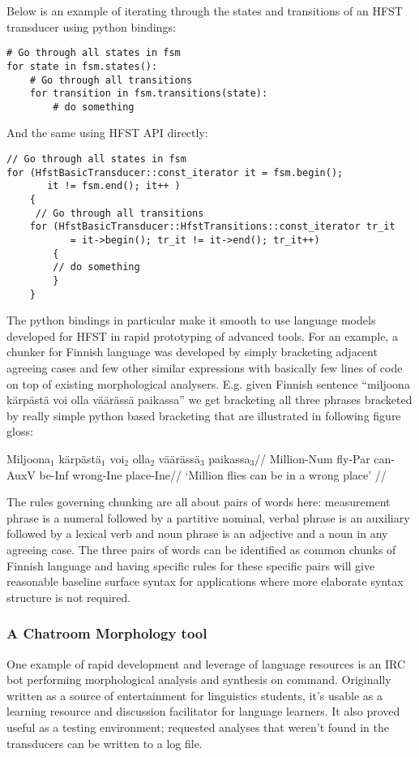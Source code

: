 \documentclass{llncs}
\begin{document}
Below is an example of iterating through the states and transitions of
an HFST transducer using python bindings:

\begin{verbatim}
# Go through all states in fsm       
for state in fsm.states():
    # Go through all transitions                                               
    for transition in fsm.transitions(state):
        # do something
\end{verbatim}

And the same using HFST API directly:

\begin{verbatim}
// Go through all states in fsm
for (HfstBasicTransducer::const_iterator it = fsm.begin();
       it != fsm.end(); it++ )      
    {      
     // Go through all transitions    
    for (HfstBasicTransducer::HfstTransitions::const_iterator tr_it  
           = it->begin(); tr_it != it->end(); tr_it++) 
        {
        // do something
        }
    }
\end{verbatim}

The python bindings in particular make it smooth to use language models
developed for HFST in rapid prototyping of advanced tools. For an example, a
chunker for Finnish language was developed by simply bracketing adjacent
agreeing cases and few other similar expressions with basically few lines of
code on top of existing morphological analysers. E.g.  given Finnish sentence
``miljoona kärpästä voi olla väärässä paikassa'' we get bracketing all three
phrases bracketed by really simple python based bracketing that are illustrated
in following figure gloss:

\ex
\begingl
\gla Miljoona$_1$ kärpästä$_1$ voi$_2$ olla$_2$ väärässä$_3$ paikassa$_3$//
\glb Million-{\sc Num} fly-{\sc Par} can-{\sc AuxV} be-{\sc Inf} wrong-{\sc Ine} place-{\sc Ine}//
\glft `Million flies can be in a wrong place' //
\endgl
\xe

The rules governing chunking are all about pairs of words here: measurement
phrase is a numeral followed by a partitive nominal, verbal phrase is an
auxiliary followed by a lexical verb and noun phrase is an adjective and a noun
in any agreeing case.  The three pairs of words can be identified as common
chunks of Finnish language and having specific rules for these specific pairs
will give reasonable baseline surface syntax for applications where more
elaborate syntax structure is not required.

\subsubsection{A Chatroom Morphology tool}
One example of rapid development and leverage of language resources is
an IRC bot performing morphological analysis and synthesis on command.
Originally written as a source of entertainment for linguistics students,
it's usable as a learning resource and discussion facilitator for
language learners. It also proved useful as a testing environment;
requested analyses that weren't found in the transducers can be written to a
log file.
\end{document}
